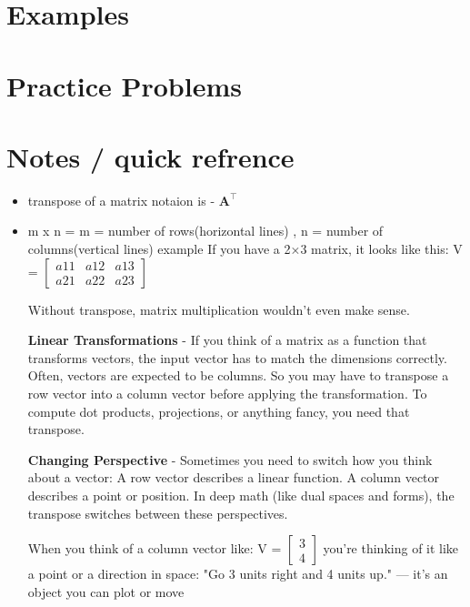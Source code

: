 \documentclass{article}
\begin{document}
\section{Examples}

\section{Practice Problems}


\section{Notes / quick refrence}
\begin{itemize}
  \item transpose of a matrix notaion is - $\mathbf{A}^\intercal$\

  \item m x n = m = number of rows(horizontal lines) , n = number of columns(vertical lines)
example If you have a 2×3 matrix, it looks like this: V = $\begin{bmatrix}
  a11 & a12 & a13 \\
  a21 & a22 & a23
\end{bmatrix}$

Without transpose, matrix multiplication wouldn’t even make sense.

\textbf{Linear Transformations} - If you think of a matrix as a function that transforms vectors, 
the input vector has to match the dimensions correctly.
    Often, vectors are expected to be columns.
    So you may have to transpose a row vector into a column vector before applying the transformation.
    To compute dot products, projections, or anything fancy, you need that transpose.

    \hspace{1cm}

    \textbf{Changing Perspective} - Sometimes you need to switch how you think about a vector:
    A row vector describes a linear function.
    A column vector describes a point or position.
    In deep math (like dual spaces and forms), the transpose switches between these perspectives.

    When you think of a column vector like: V = $\begin{bmatrix}
      3 \\
      4
    \end{bmatrix}$
    you're thinking of it like a point or a direction in space:
    "Go 3 units right and 4 units up."
    — it's an object you can plot or move


\end{itemize}
\end{document}
